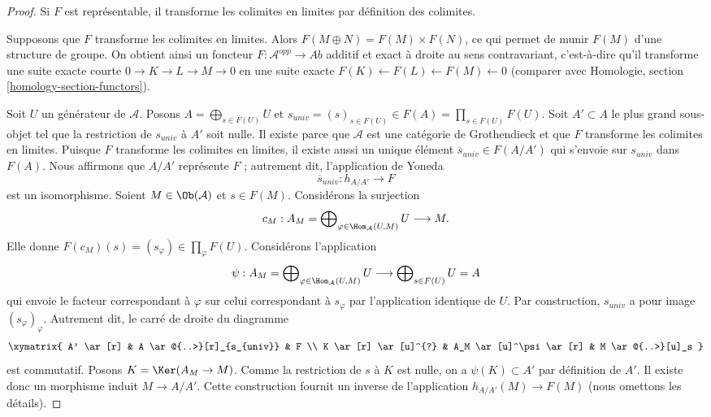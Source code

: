 \begin{proof}
Si $F$ est représentable, il transforme les colimites en limites par
définition des colimites.

\medskip\noindent
Supposons que $F$ transforme les colimites en limites. Alors
$F(M \oplus N) = F(M) \times F(N)$, ce qui permet de munir $F(M)$ d'une
structure de groupe. On obtient ainsi un foncteur
$F : \mathcal{A}^{opp} \to \textit{Ab}$ additif et exact à droite au sens
contravariant, c'est-à-dire qu'il transforme une suite exacte courte
$0 \to K \to L \to M \to 0$ en une suite exacte
$F(K) \leftarrow F(L) \leftarrow F(M) \leftarrow 0$ (comparer avec
Homologie, section \ref{homology-section-functors}).

\medskip\noindent
Soit $U$ un générateur de $\mathcal{A}$. Posons
$A = \bigoplus_{s \in F(U)} U$ et
$s_{univ} = (s)_{s \in F(U)} \in F(A) = \prod_{s \in F(U)} F(U)$.
Soit $A' \subset A$ le plus grand sous-objet tel que la restriction de
$s_{univ}$ à $A'$ soit nulle. Il existe parce que $\mathcal{A}$ est une
catégorie de Grothendieck et que $F$ transforme les colimites en limites.
Puisque $F$ transforme les colimites en limites, il existe aussi un unique
élément $\overline{s}_{univ} \in F(A/A')$ qui s'envoie sur $s_{univ}$ dans
$F(A)$.
Nous affirmons que $A/A'$ représente $F$ ; autrement dit, l'application de
Yoneda
$$
\overline{s}_{univ} : h_{A/A'} \longrightarrow F
$$
est un isomorphisme. Soient $M \in \Ob(\mathcal{A})$ et $s \in F(M)$.
Considérons la surjection
$$
c_M :
A_M = \bigoplus\nolimits_{\varphi \in \Hom_\mathcal{A}(U, M)} U
\longrightarrow
M.
$$
Elle donne $F(c_M)(s) = (s_\varphi) \in \prod_\varphi F(U)$.
Considérons l'application
$$
\psi :
A_M = \bigoplus\nolimits_{\varphi \in \Hom_\mathcal{A}(U, M)} U
\longrightarrow
\bigoplus\nolimits_{s \in F(U)} U = A
$$
qui envoie le facteur correspondant à $\varphi$ sur celui correspondant à
$s_\varphi$ par l'application identique de $U$. Par construction, $s_{univ}$
a pour image $(s_\varphi)_\varphi$. Autrement dit, le carré de droite du
diagramme
$$
\xymatrix{
A' \ar[r] &
A \ar@{..>}[r]_{s_{univ}} & F \\
K \ar[r] \ar[u]^{?} & A_M \ar[u]^\psi \ar[r] &
M \ar@{..>}[u]_s
}
$$
est commutatif. Posons $K = \Ker(A_M \to M)$. Comme la restriction de $s$
à $K$ est nulle, on a $\psi(K) \subset A'$ par définition de $A'$. Il existe
donc un morphisme induit $M \to A/A'$. Cette construction fournit un inverse
de l'application $h_{A/A'}(M) \to F(M)$ (nous omettons les détails).
\end{proof}

